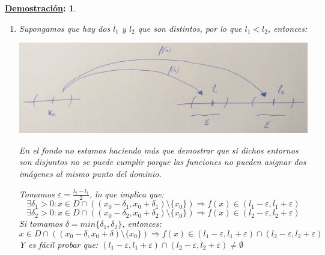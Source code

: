 \documentclass[10pt,a4paper,openright]{book}
\theoremstyle{break}
\newtheorem*{demo}{\underline{Demostración}:}
\begin{document}
\begin{demo}
\begin{enumerate}
\item Supongamos que hay dos $l_1$ y $l_2$ que son distintos, por lo que $l_1<l_2$, entonces:

\begin{center}
\includegraphics[scale=0.30]{limite doble}
\end{center}

En el fondo no estamos haciendo más que demostrar que si dichos entornos son disjuntos no se puede cumplir porque las funciones no pueden asignar dos imágenes al mismo punto del dominio.

Tomamos $\varepsilon=\frac{l_2-l_1}{2}$, lo que implica que:
$$\exists \delta_1>0: x\in D\cap \left((x_0-\delta_1, x_0+\delta_1)\mbox{\textbackslash}\{x_0\}\right) \Rightarrow f(x)\in (l_1-\varepsilon, l_1+\varepsilon)$$
$$\exists \delta_2>0: x\in D\cap \left((x_0-\delta_2, x_0+\delta_2)\mbox{\textbackslash}\{x_0\}\right) \Rightarrow f(x)\in (l_2-\varepsilon, l_2+\varepsilon)$$
Si tomamos $\delta=min\{\delta_1, \delta_2\}$, entonces:
$$x\in D\cap \left((x_0-\delta, x_0+\delta)\mbox{\textbackslash}\{x_0\}\right) \Rightarrow f(x)\in (l_1-\varepsilon, l_1+\varepsilon)\cap (l_2-\varepsilon, l_2+\varepsilon)$$
Y es fácil probar que: $(l_1-\varepsilon, l_1+\varepsilon)\cap (l_2-\varepsilon, l_2+\varepsilon)\neq \emptyset$
\end{enumerate}
\end{demo}
\end{document}
